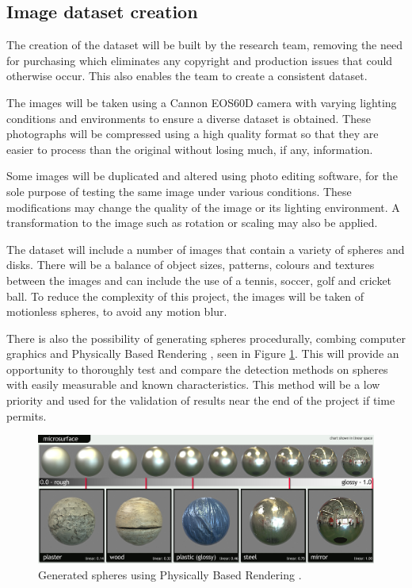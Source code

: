 \documentclass[11pt]{scrartcl}
\begin{document}
{        \subsection{Image dataset creation} {

        	The creation of the dataset will be built by the research team, removing
        	the need for purchasing which eliminates any copyright and production
        	issues that could otherwise occur. This also enables the team to
        	create a consistent dataset.

        	The images will be taken using a Cannon EOS60D camera with varying
        	lighting conditions and environments to ensure a diverse dataset is
        	obtained. These photographs will be compressed using a high quality
        	format so that they are easier to process than the original without
        	losing much, if any, information.

        	Some images will be duplicated and altered using photo editing software,
        	for the sole purpose of testing the same image under various 
        	conditions. These modifications may change the quality of the image or
        	its lighting environment. A transformation to the image such as rotation
        	or scaling may also be applied.

            The dataset will include a number of images that contain a variety
            of spheres and disks. There will be a balance of object sizes,
            patterns, colours and textures between the images and can include
            the use of a tennis, soccer, golf and cricket ball. To reduce the
            complexity of this project, the images will be taken of motionless spheres, to avoid any motion blur.
            
            There is also the possibility of generating spheres procedurally, combing computer graphics and Physically Based Rendering \citep{pbr}, seen in Figure \ref{figure:pba}. This will provide an opportunity to thoroughly test and compare the detection methods on spheres with easily measurable and known characteristics. This method will be a low priority and used for the validation of results near the end of the project if time permits.
            
			\begin{figure}[H]            
				\centering
    	        \includegraphics[width=13cm]{microcompare05.jpg}
	            \caption[Project Schedule] {
                	Generated spheres using Physically Based Rendering \citep{pbr}.
				}
				\label{figure:pba}
            \end{figure}
            
}}
\end{document}
